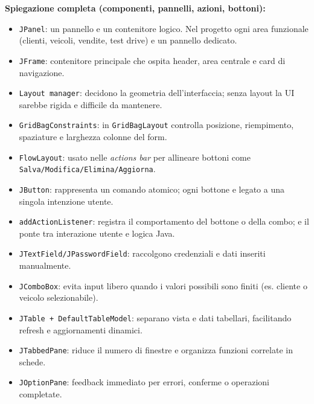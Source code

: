 \documentclass[12pt,a4paper]{article}
\begin{document}
\textbf{Spiegazione completa (componenti, pannelli, azioni, bottoni):}
\begin{itemize}
  \item \texttt{JPanel}: un pannello e un contenitore logico. Nel progetto ogni area funzionale (clienti, veicoli, vendite, test drive) e un pannello dedicato.
  \item \texttt{JFrame}: contenitore principale che ospita header, area centrale e card di navigazione.
  \item \texttt{Layout manager}: decidono la geometria dell'interfaccia; senza layout la UI sarebbe rigida e difficile da mantenere.
  \item \texttt{GridBagConstraints}: in \texttt{GridBagLayout} controlla posizione, riempimento, spaziature e larghezza colonne del form.
  \item \texttt{FlowLayout}: usato nelle \emph{actions bar} per allineare bottoni come \texttt{Salva/Modifica/Elimina/Aggiorna}.
  \item \texttt{JButton}: rappresenta un comando atomico; ogni bottone e legato a una singola intenzione utente.
  \item \texttt{addActionListener}: registra il comportamento del bottone o della combo; e il ponte tra interazione utente e logica Java.
  \item \texttt{JTextField/JPasswordField}: raccolgono credenziali e dati inseriti manualmente.
  \item \texttt{JComboBox}: evita input libero quando i valori possibili sono finiti (es. cliente o veicolo selezionabile).
  \item \texttt{JTable + DefaultTableModel}: separano vista e dati tabellari, facilitando refresh e aggiornamenti dinamici.
  \item \texttt{JTabbedPane}: riduce il numero di finestre e organizza funzioni correlate in schede.
  \item \texttt{JOptionPane}: feedback immediato per errori, conferme o operazioni completate.
\end{itemize}
\end{document}
